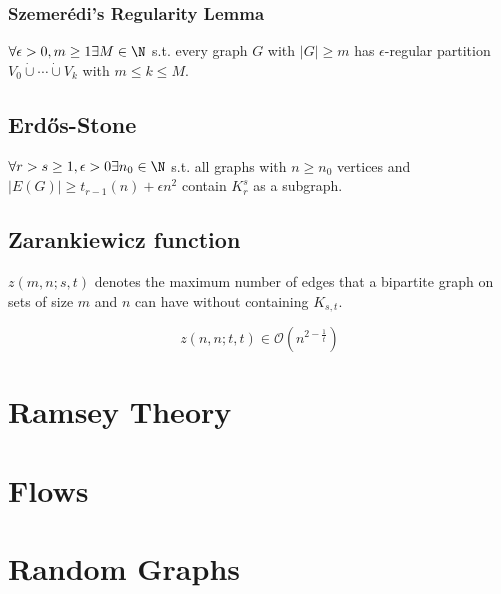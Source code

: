 \subsubsection*{Szemer\'{e}di's Regularity Lemma}

$\forall \epsilon > 0, m \geq 1 \exists M \in \N$ s.t. every graph $G$ with $|G| \geq m$ has $\epsilon$-regular partition $V_0 \dot\cup\cdots\dot\cup V_k$ with $m \leq k \leq M$.

\subsection*{Erd\H{o}s-Stone}

$\forall r > s \geq 1, \epsilon > 0 \exists n_0 \in \N$ s.t. all graphs with $n \geq n_0$ vertices and $|E(G)| \geq t_{r-1}(n)+\epsilon n^2$ contain $K_r^s$ as a subgraph.

\subsection*{Zarankiewicz function}

$z(m,n;s,t)$ denotes the maximum number of edges that a bipartite graph on sets of size $m$ and $n$ can have without containing $K_{s,t}$.

$$z(n,n;t,t) \in \mathcal{O}(n^{2-\frac{1}{t}})$$

\section*{Ramsey Theory}

\section*{Flows}

\section*{Random Graphs}
